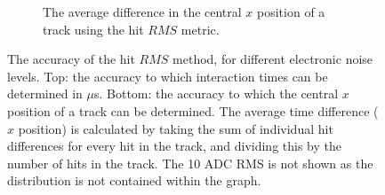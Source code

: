 \begin{figure}
\begin{subfigure}{0.6\textwidth}
    \caption{The average difference in the central $x$ position of a track using the hit $RMS$ metric.}
    \label{fig:DiffNoiseStudy_AvDiffRMS_X}
  \end{subfigure}
  \caption[Comparing the accuracy of the hit $RMS$ method, as the electronic noise changes]
          {The accuracy of the hit $RMS$ method, for different electronic noise levels. Top: the accuracy to which interaction times can be determined in $\mu$s. Bottom: the accuracy to which the central $x$ position of a track can be determined. The average time difference ($x$ position) is calculated by taking the sum of individual hit differences for every hit in the track, and dividing this by the number of hits in the track. The 10 ADC RMS is not shown as the distribution is not contained within the graph.}
  \label{fig:DiffNoiseStudy_AvDiff_RMS}
\end{figure}

